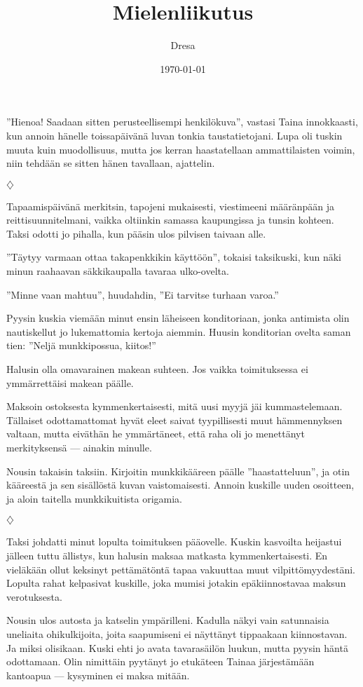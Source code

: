 ﻿\documentclass[a4paper, 12pt, finnish]{article}
\title{Mielenliikutus}
\author{Dresa}
\date{\today}
\newcommand{\q}[1]{''#1''}
\def\jump{\vspace{2mm} \centerline{$\diamondsuit$} \vspace{2mm}}
\begin{document}
\maketitle

\q{Hienoa! Saadaan sitten perusteellisempi henkilökuva}, vastasi Taina
innokkaasti, kun annoin hänelle toissapäivänä luvan tonkia
taustatietojani. Lupa oli tuskin muuta kuin muodollisuus,
mutta jos kerran haastatellaan ammattilaisten voimin,
niin tehdään se sitten hänen tavallaan, ajattelin. 


\jump


Tapaamispäivänä merkitsin, tapojeni mukaisesti, viestimeeni
määränpään ja reittisuunnitelmani, vaikka oltiinkin samassa kaupungissa
ja tunsin kohteen.
Taksi odotti jo pihalla, kun pääsin ulos pilvisen taivaan alle.

\q{Täytyy varmaan ottaa takapenkkikin käyttöön}, tokaisi taksikuski,
kun näki minun raahaavan säkkikaupalla tavaraa ulko-ovelta.

\q{Minne vaan mahtuu}, huudahdin, \q{Ei tarvitse turhaan varoa.}

Pyysin kuskia viemään minut ensin läheiseen konditoriaan,
jonka antimista olin nautiskellut jo lukemattomia kertoja aiemmin.
Huusin konditorian ovelta saman tien: \q{Neljä munkkipossua, kiitos!}

Halusin olla omavarainen makean suhteen. Jos vaikka toimituksessa ei ymmärrettäisi makean päälle.

Maksoin ostoksesta kymmenkertaisesti, mitä uusi myyjä jäi kummastelemaan.
Tällaiset odottamattomat hyvät eleet saivat tyypillisesti
muut hämmennyksen valtaan, mutta eiväthän he ymmärtäneet,
että raha oli jo menettänyt merkityksensä --- ainakin minulle.

Nousin takaisin taksiin. Kirjoitin munkkikääreen päälle \q{haastatteluun},
ja otin kääreestä ja sen sisällöstä kuvan vaistomaisesti. Annoin
kuskille uuden osoitteen, ja aloin taitella munkkikuitista origamia.


\jump


Taksi johdatti minut lopulta toimituksen pääovelle. Kuskin kasvoilta
heijastui jälleen tuttu ällistys, kun halusin maksaa matkasta
kymmenkertaisesti. En vieläkään ollut keksinyt pettämätöntä tapaa
vakuuttaa muut vilpittömyydestäni. Lopulta rahat kelpasivat kuskille,
joka mumisi jotakin epäkiinnostavaa maksun verotuksesta.
 
Nousin ulos autosta ja katselin ympärilleni. Kadulla näkyi vain
satunnaisia uneliaita ohikulkijoita, joita saapumiseni ei näyttänyt
tippaakaan kiinnostavan. Ja miksi olisikaan. Kuski ehti jo avata
tavarasäilön luukun, mutta pyysin häntä odottamaan. Olin nimittäin
pyytänyt jo etukäteen Tainaa järjestämään kantoapua --- kysyminen ei
maksa mitään.
\end{document}
